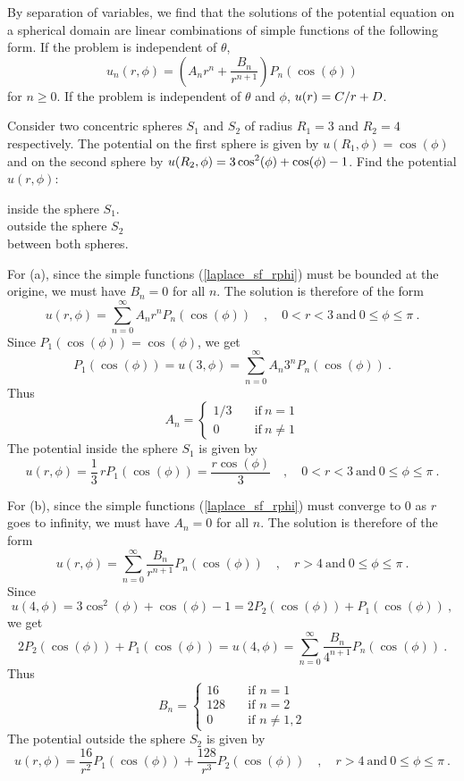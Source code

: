 By separation of variables, we find that the solutions of the
potential equation on a spherical domain are linear combinations of
simple functions of the following form.  If the problem is independent
of $\theta$,
\begin{equation}\label{laplace_sf_rphi}
u_n(r,\phi) = \left(A_n r^n + \frac{B_n}{r^{n+1}} \right)
P_n(\cos(\phi))
\end{equation}
for $n \geq 0$.  If the problem is independent of $\theta$ and $\phi$,
$\displaystyle u(r) = C/r + D$.

\begin{egg}
Consider two concentric spheres $S_1$ and $S_2$ of radius $R_1=3$ and
$R_2=4$ respectively.  The potential on the first sphere is given by
$u(R_1,\phi) = \cos(\phi)$ and on the second sphere by
$\displaystyle u(R_2,\phi)= 3 \cos^2(\phi) + \cos(\phi) -1$.  Find the potential
$u(r,\phi)$:

 inside the sphere $S_1$.\\
 outside the sphere $S_2$\\
 between both spheres.

For (a), since the simple functions (\ref{laplace_sf_rphi}) must be
bounded at the origine, we must have $B_n=0$ for all $n$.  The
solution is therefore of the form
\[
u(r,\phi) = \sum_{n=0}^\infty A_n r^n P_n(\cos(\phi))
\quad , \quad 0 < r < 3 \ \text{and} \ 0 \leq \phi \leq \pi \ .
\]
Since $P_1(\cos(\phi)) = \cos(\phi)$, we get
\[
P_1(\cos(\phi)) = u(3,\phi) = \sum_{n=0}^\infty A_n 3^n P_n(\cos(\phi)) \ .
\]
Thus
\[
A_n = \begin{cases}
1/3 & \quad \text{if}\ n=1\\
0 & \quad \text{if} \ n\neq 1
\end{cases}
\]
The potential inside the sphere $S_1$ is given by
\[
u(r,\phi) = \frac{1}{3} \, r P_1(\cos(\phi)) = \frac{r\cos(\phi)}{3}
\quad , \quad 0 < r < 3 \ \text{and} \ 0 \leq \phi \leq \pi \ .
\]

For (b), since the simple functions (\ref{laplace_sf_rphi}) must converge to
$0$ as $r$ goes to infinity, we must have $A_n=0$ for all $n$.  The solution is
therefore of the form
\[
u(r,\phi) = \sum_{n=0}^\infty \frac{B_n}{r^{n+1}}
P_n(\cos(\phi))
\quad , \quad r > 4 \ \text{and} \ 0 \leq \phi \leq \pi \ .
\]
Since
\[
u(4,\phi) = 3 \cos^2(\phi) + \cos(\phi) -1 = 2 P_2(\cos(\phi)) +
P_1(\cos(\phi)) \ ,
\]
we get
\[
2 P_2(\cos(\phi)) + P_1(\cos(\phi)) = u(4,\phi)
= \sum_{n=0}^\infty \frac{B_n}{4^{n+1}} P_n(\cos(\phi)) \ .
\]
Thus
\[
B_n = \begin{cases}
16 & \quad \text{if $n=1$}\\
128 & \quad \text{if $n=2$} \\
0 &  \quad \text{if $n\neq 1,2$}
\end{cases}
\]
The potential outside the sphere $S_2$ is given by
\[
u(r,\phi) = \frac{16}{r^2} P_1(\cos(\phi)) + \frac{128}{r^3} P_2(\cos(\phi))
\quad , \quad r > 4 \ \text{and} \ 0 \leq \phi \leq \pi \ .
\]


\end{egg}
